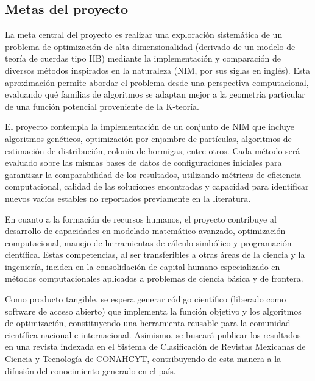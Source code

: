 \subsection{Metas del proyecto}
La meta central del proyecto es realizar una exploración
sistemática de un problema de optimización de alta
dimensionalidad (derivado de un modelo de teoría de cuerdas
tipo IIB) mediante la implementación y comparación de diversos
métodos inspirados en la naturaleza (NIM, por sus siglas en
inglés). Esta aproximación permite abordar el problema desde
una perspectiva computacional, evaluando qué familias de
algoritmos se adaptan mejor a la geometría particular de una
función potencial proveniente de la K-teoría.

El proyecto contempla la implementación de un conjunto de NIM
que incluye algoritmos genéticos, optimización por enjambre de
partículas, algoritmos de estimación de distribución, colonia
de hormigas, entre otros. Cada método será evaluado sobre las
mismas bases de datos de configuraciones iniciales para
garantizar la comparabilidad de los resultados, utilizando
métricas de eficiencia computacional, calidad de las
soluciones encontradas y capacidad para identificar nuevos
vacíos estables no reportados previamente en la literatura.

En cuanto a la formación de recursos humanos, el proyecto
contribuye al desarrollo de capacidades en modelado matemático
avanzado, optimización computacional, manejo de herramientas
de cálculo simbólico y programación científica. Estas
competencias, al ser transferibles a otras áreas de la ciencia
y la ingeniería, inciden en la consolidación de capital humano
especializado en métodos computacionales aplicados a problemas
de ciencia básica y de frontera.

Como producto tangible, se espera generar código científico
(liberado como software de acceso abierto) que implementa la
función objetivo y los algoritmos de optimización,
constituyendo una herramienta reusable para la comunidad
científica nacional e internacional. Asimismo, se buscará
publicar los resultados en una revista indexada en el Sistema
de Clasificación de Revistas Mexicanas de Ciencia y Tecnología
de CONAHCYT, contribuyendo de esta manera a la difusión del
conocimiento generado en el país.
